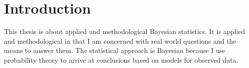 \documentclass[a4paper, nobind]{templates/ociamthesis}
\begin{document}
\begin{romanpages}
  \dominitoc %

\flushbottom

\tableofcontents

\listoffigures
	\mtcaddchapter

\listoftables
  \mtcaddchapter




\end{romanpages}

\flushbottom

\hypertarget{introduction}{%
\chapter{Introduction}\label{introduction}}

\adjustmtc
{}

This thesis is about applied and methodological Bayesian statistics.
It is applied and methodological in that I am concerned with real world questions and the means to answer them.
The statistical approach is Bayesian because I use probability theory to arrive at conclusions based on models for observed data.
\end{document}

